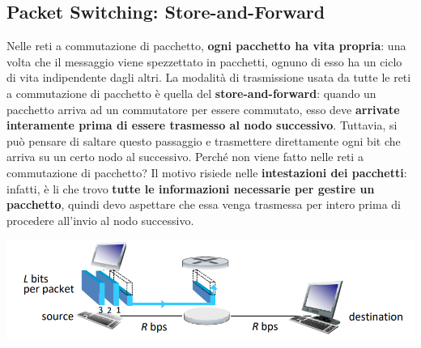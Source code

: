\documentclass[12pt]{article}
\begin{document}
\subsection{Packet Switching: Store-and-Forward}
Nelle reti a commutazione di pacchetto, \textbf{ogni pacchetto ha vita propria}: una volta che il messaggio viene spezzettato in pacchetti, ognuno di esso
ha un ciclo di vita indipendente dagli altri. La modalità di trasmissione usata da tutte le reti a commutazione di pacchetto è quella del \textbf{store-and-forward}:
quando un pacchetto arriva ad un commutatore per essere commutato, esso deve \textbf{arrivate interamente prima di essere trasmesso al nodo successivo}. Tuttavia, si può pensare
di saltare questo passaggio e trasmettere direttamente ogni bit che arriva su un certo nodo al successivo. Perché non viene fatto nelle reti a commutazione di pacchetto? Il motivo risiede nelle \textbf{intestazioni dei pacchetti}:
infatti, è li che trovo \textbf{tutte le informazioni necessarie per gestire un pacchetto}, quindi devo aspettare che essa venga trasmessa per intero prima di procedere all'invio al nodo successivo.
\begin{center}
    \includegraphics[width =1\linewidth]{Images/6.PNG}
\end{center}
\end{document}
